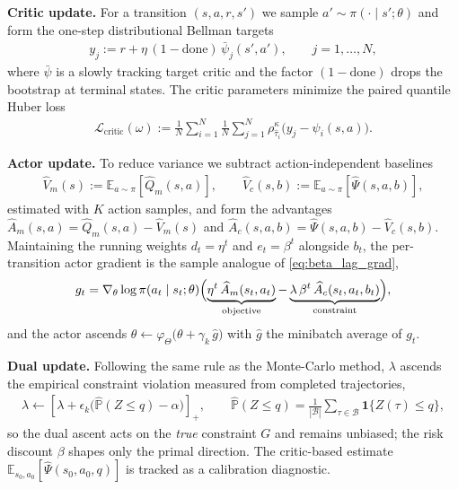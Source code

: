 \textbf{Critic update.} For a transition $(s,a,r,s')$ we sample $a'\sim\pi(\cdot\mid s';\theta)$ and form the one-step distributional Bellman targets
\begin{align}
    y_j:=r+\eta\,(1-\mathrm{done})\,\bar{\psi}_j(s',a'),
    \qquad j=1,\dots,N,
\end{align}
where $\bar{\psi}$ is a slowly tracking target critic and the factor $(1-\mathrm{done})$ drops the bootstrap at terminal states. The critic parameters minimize the paired quantile Huber loss
\begin{align}\label{eq:critic_loss}
    \mathcal{L}_{\mathrm{critic}}(\omega)
    :=
    \frac{1}{N}\sum_{i=1}^{N}\frac{1}{N}\sum_{j=1}^{N}
    \rho_{\hat{\tau}_i}^{\kappa}\!\bigl(y_j-\psi_i(s,a)\bigr).
\end{align}

\textbf{Actor update.} To reduce variance we subtract action-independent baselines
\begin{align}
    \widehat{V}_m(s):=\mathbb{E}_{a\sim\pi}[\widehat{Q}_m(s,a)],
    \qquad
    \widehat{V}_c(s,b):=\mathbb{E}_{a\sim\pi}[\widehat{\Psi}(s,a,b)],
\end{align}
estimated with $K$ action samples, and form the advantages $\widehat{A}_m(s,a)=\widehat{Q}_m(s,a)-\widehat{V}_m(s)$ and $\widehat{A}_c(s,a,b)=\widehat{\Psi}(s,a,b)-\widehat{V}_c(s,b)$. Maintaining the running weights $d_t=\eta^t$ and $e_t=\beta^t$ alongside $b_t$, the per-transition actor gradient is the sample analogue of \eqref{eq:beta_lag_grad},
\begin{align}\label{eq:actor_g}
    g_t
    =
    \nabla_{\theta}\log\pi(a_t\mid s_t;\theta)
    \Bigl(
        \underbrace{\eta^t\,\widehat{A}_m(s_t,a_t)}_{\text{objective}}
        -
        \underbrace{\lambda\,\beta^t\,\widehat{A}_c(s_t,a_t,b_t)}_{\text{constraint}}
    \Bigr),
\end{align}
and the actor ascends $\theta\gets\varphi_{\Theta}\bigl(\theta+\gamma_k\,\widehat{g}\bigr)$ with $\widehat{g}$ the minibatch average of $g_t$.

\textbf{Dual update.} Following the same rule as the Monte-Carlo method, $\lambda$ ascends the empirical constraint violation measured from completed trajectories,
\begin{align}\label{eq:dual_update}
    \lambda\gets\left[\lambda+\epsilon_k\bigl(\widehat{\mathbb{P}}(Z\le q)-\alpha\bigr)\right]_{+},
    \qquad
    \widehat{\mathbb{P}}(Z\le q)=\frac{1}{|\mathcal{B}|}\sum_{\tau\in\mathcal{B}}\mathbf{1}\{Z(\tau)\le q\},
\end{align}
so the dual ascent acts on the \emph{true} constraint $G$ and remains unbiased; the risk discount $\beta$ shapes only the primal direction. The critic-based estimate $\mathbb{E}_{s_0,a_0}[\widehat{\Psi}(s_0,a_0,q)]$ is tracked as a calibration diagnostic.


